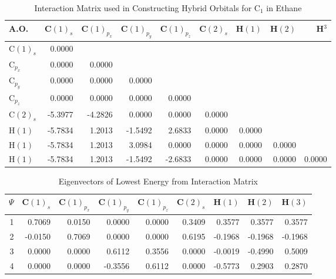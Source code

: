 \begin{table}
\caption{\label{c2h6c1}Interaction Matrix used in Constructing Hybrid Orbitals for C$_1$ in Ethane}
\begin{center}
\begin{tabular}{l|rrrrrrrr} 
\hline
A.O. &   C$(1)_s$ &C$(1)_{p_x}$ & C$(1)_{p_y}$ &  C$(1)_{p_z}$ &  C$(2)_s$ &H$(1)$ &H$(2)$ & H$^3$ \\
\hline
C$(1)_s$ & 0.0000  &  \\
C$_{p_x}$& 0.0000  & 0.0000  &  \\
C$_{p_y}$& 0.0000  & 0.0000  & 0.0000 &      \\
C$_{p_z}$& 0.0000  & 0.0000  & 0.0000 &  0.0000 &   \\
C$(2)_s$ &-5.3977  &-4.2826  & 0.0000 &  0.0000 &  0.0000  \\
H$(1)$   &-5.7834  & 1.2013  &-1.5492 &  2.6833 &  0.0000 &  0.0000  \\
H$(1)$   &-5.7834  & 1.2013  & 3.0984 &  0.0000 &  0.0000 &  0.0000 &  0.0000  \\
H$(1)$   &-5.7834  & 1.2013  &-1.5492 & -2.6833 &  0.0000 &  0.0000 &  0.0000 &  0.0000  \\
\hline
\end{tabular}
\end{center}
\end{table}

\begin{table}
\caption{\label{low4}Eigenvectors of Lowest Energy from Interaction Matrix}
\begin{center}
\begin{tabular}{r|rrrrrrrr}  \hline
$\Psi$ &   C$(1)_s$ &C$(1)_{p_x}$ & C$(1)_{p_y}$ &  C$(1)_{p_z}$ &  
C$(2)_s$ &H$(1)$ &H$(2)$ & H$(3)$ \\
\hline
1&  0.7069& 0.0150& 0.0000& 0.0000& 0.3409& 0.3577& 0.3577& 0.3577 \\
2& -0.0150& 0.7069& 0.0000& 0.0000& 0.6195&-0.1968&-0.1968&-0.1968 \\
3&  0.0000& 0.0000& 0.6112& 0.3556& 0.0000&-0.0019&-0.4990& 0.5009 \\
4&  0.0000& 0.0000&-0.3556& 0.6112& 0.0000&-0.5773& 0.2903& 0.2870 \\
\hline
\end{tabular}
\end{center}
\end{table}

